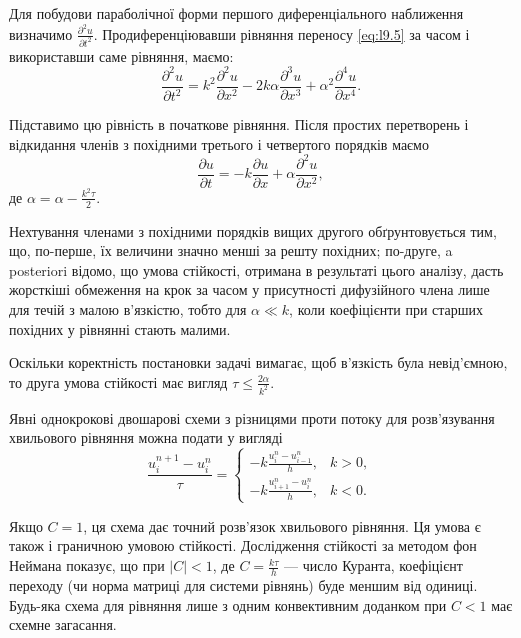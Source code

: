 Для побудови параболічної форми першого диференціального наближення визначимо $\frac{\partial^2 u}{\partial t^2}$. Продиференціювавши рівняння переносу \eqref{eq:l9.5} за часом і використавши саме рівняння, маємо:
\begin{equation*}
    \frac{\partial^2 u}{\partial t^2} = k^2 \frac{\partial^2 u}{\partial x^2} - 2 k \alpha \frac{\partial^3 u}{\partial x^3} + \alpha^2 \frac{\partial^4 u}{\partial x^4}.
\end{equation*}

Підставимо цю рівність в початкове рівняння. Після простих перетворень і відкидання членів з похідними третього і четвертого порядків маємо
\begin{equation}
    \label{eq:l9.8}
    \frac{\partial u}{\partial t} = -k \frac{\partial u}{\partial x} + \alpha \frac{\partial^2 u}{\partial x^2},
\end{equation}
де $\alpha = \alpha - \frac{k^2 \tau}{2}$.  \medskip

Нехтування членами з похідними порядків вищих другого обґрунтовується тим, що, по-перше, їх величини значно менші за решту похідних; по-друге, a posteriori відомо, що умова стійкості, отримана в результаті цього аналізу, дасть жорсткіші обмеження на крок за часом у присутності дифузійного члена лише для течій з малою в'язкістю, тобто для $\alpha \ll k$, коли коефіцієнти при старших похідних у рівнянні стають малими. \medskip

Оскільки коректність постановки задачі вимагає, щоб в'язкість була невід'ємною, то друга умова стійкості має вигляд  $\tau \le \frac{2\alpha}{k^2}$.

\begin{example}
    Явні однокрокові двошарові схеми з різницями проти потоку для розв'язування хвильового рівняння можна подати у вигляді
    \begin{equation}
        \label{eq:l9.9}
        \frac{u_i^{n+1} - u_i^n}{\tau} = \begin{cases}
            -k \frac{u_i^n - u_{i-1}^n}{h}, & k > 0, \\
            -k \frac{u_{i+1}^n - u_i^n}{h}, & k < 0.
        \end{cases}
    \end{equation}
\end{example}

Якщо $C = 1$, ця схема дає точний розв'язок хвильового рівняння. Ця умова є також і граничною умовою стійкості. Дослідження стійкості за методом фон Неймана показує, що при $|C| < 1$, де $C = \frac{k\tau}{h}$ --- число Куранта, коефіцієнт переходу (чи норма матриці для системи рівнянь) буде меншим від одиниці. Будь-яка схема для рівняння лише з одним конвективним доданком при $C < 1$  має схемне загасання. \medskip


